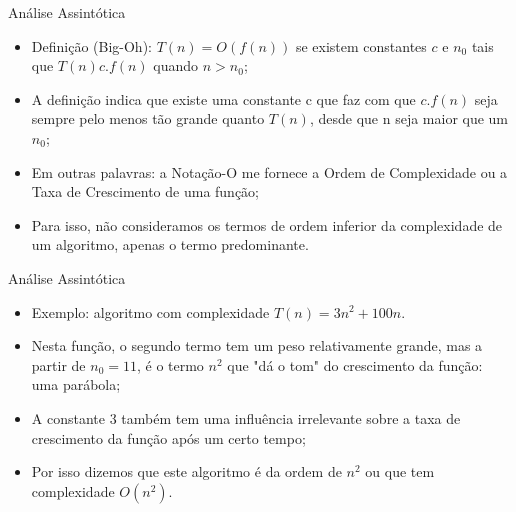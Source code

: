 \documentclass[12pt,table,xcolor={dvipsnames}]{beamer}
\begin{document}
\begin{frame}[fragile]{Análise Assintótica}
\begin{itemize}
\item Definição (Big-Oh): $T(n) = O(f(n))$ se existem constantes $c$ e $n_0$ tais que $T(n)c.f(n)$ quando $n > n_{0}$;
\item A definição indica que existe uma constante c que faz com que $c.f(n)$ seja sempre pelo menos tão grande quanto $T(n)$, desde que n seja maior que um $n_0$;
\item Em outras palavras: a Notação-O me fornece a Ordem de Complexidade ou a Taxa de Crescimento de uma função;
\item Para isso, não consideramos os termos de ordem inferior da complexidade de um algoritmo, apenas o termo predominante.
\end{itemize}
\end{frame}

\begin{frame}[fragile]{Análise Assintótica}
\begin{itemize}
\item Exemplo: algoritmo com complexidade $T(n) = 3n^2 + 100n$.
\item Nesta função, o segundo termo tem um peso relativamente grande, mas a partir de $n_0 = 11$, é o termo $n^2$ que "dá o tom" do crescimento da função: uma parábola;
\item A constante 3 também tem uma influência irrelevante sobre a taxa de crescimento da função após um certo tempo;
\item Por isso dizemos que este algoritmo é da ordem de $n^2$ ou que tem complexidade $O(n^2)$.
\end{itemize}
\end{frame}
\end{document}
